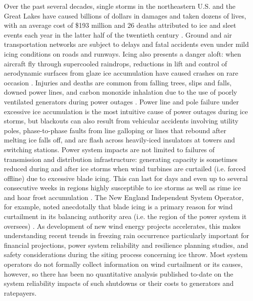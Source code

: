 \documentclass[twocol]{ametsoc}
\begin{document}
Over the past several decades, single storms in the northeastern U.S. and the Great Lakes have caused billions of dollars in damages and taken dozens of lives, with an average cost of \$193 million and 26 deaths attributed to ice and sleet events each year in the latter half of the twentieth century \citep{lott2006tracking, changnon2006severe, ncei2019storm}. Ground and air transportation networks are subject to delays and fatal accidents even under mild icing conditions on roads and runways. Icing also presents a danger aloft: when aircraft fly through supercooled raindrops, reductions in lift and control of aerodynamic surfaces from glaze ice accumulation have caused crashes on rare occasion \citep{bernstein2000freezing}. Injuries and deaths are common from falling trees, slips and falls, downed power lines, and carbon monoxide inhalation due to the use of poorly ventilated generators during power outages \citep{daley2000outbreak}. Power line and pole failure under excessive ice accumulation is the most intuitive cause of power outages during ice storms, but blackouts can also result from vehicular accidents involving utility poles, phase-to-phase faults from line galloping or lines that rebound after melting ice falls off, and arc flash across heavily-iced insulators at towers and switching stations. Power system impacts are not limited to failures of transmission and distribution infrastructure: generating capacity is sometimes reduced during and after ice storms when wind turbines are curtailed (i.e. forced offline) due to excessive blade icing. This can last for days and even up to several consecutive weeks in regions highly susceptible to ice storms as well as rime ice and hoar frost accumulation \citep{davis2014forecast}. The New England Independent System Operator, for example, noted anecdotally that blade icing is a primary reason for wind curtailment in its balancing authority area (i.e. the region of the power system it oversees) \citep{bird2014wind}. As development of new wind energy projects accelerates, this makes understanding recent trends in freezing rain occurrence particularly important for financial projections, power system reliability and resilience planning studies, and safety considerations during the siting process concerning ice throw. Most system operators do not formally collect information on wind curtailment or its causes, however, so there has been no quantitative analysis published to-date on the system reliability impacts of such shutdowns or their costs to generators and ratepayers.
\end{document}
